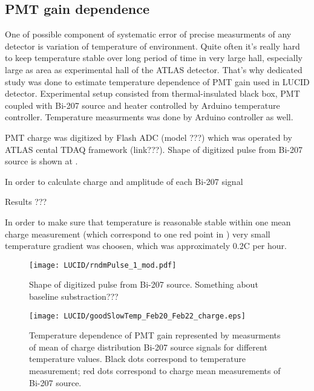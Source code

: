 \subsection{PMT gain dependence}
\label{subsec:pmtGainTempDep}


One of possible component of systematic error of precise measurments of any detector is variation of temperature of environment.
Quite often it's really hard to keep temperature stable over long period of time in very large hall, especially large as area as experimental hall of the ATLAS detector.
That's why dedicated study was done to estimate temperature dependence of PMT gain used in LUCID detector.
Experimental setup consisted from thermal-insulated black box, PMT coupled with Bi-207 source and heater controlled by Arduino temperature controller.
Temperature measurments was done by Arduino controller as well.

PMT charge was digitized by Flash ADC (model ???) which was operated by ATLAS cental TDAQ framework (link???).
Shape of digitized pulse from Bi-207 source is shown at . 

In order to calculate charge and amplitude of each Bi-207 signal 

Results ???

In order to make sure that temperature is reasonable stable within one mean charge measurement (which correspond to one red point in ) 
very small temperature gradient was choosen, which was approximately 0.2\degree C per hour. 


\begin{figure}
\centering
\texttt{[image: LUCID/rndmPulse\_1\_mod.pdf]}
\caption{Shape of digitized pulse from Bi-207 source. Something about baseline substraction??? }
\label{fig:bi207DigitizedPulse}
\end{figure}


\begin{figure}
\centering
\texttt{[image: LUCID/goodSlowTemp\_Feb20\_Feb22\_charge.eps]}
\caption{Temperature dependence of PMT gain represented by measurments of mean of charge distribution Bi-207 source signals for different temperature values.
Black dots correspond to temperature measurement; red dots correspond to charge mean measurements of Bi-207 source.}
\label{fig:PMTChargeTempDep}
\end{figure}


